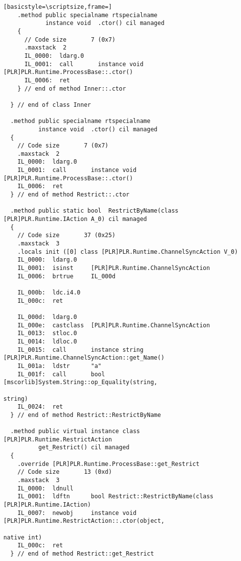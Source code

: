 \begin{lstlisting}[basicstyle=\scriptsize,frame=]
    .method public specialname rtspecialname 
            instance void  .ctor() cil managed
    {
      // Code size       7 (0x7)
      .maxstack  2
      IL_0000:  ldarg.0
      IL_0001:  call       instance void [PLR]PLR.Runtime.ProcessBase::.ctor()
      IL_0006:  ret
    } // end of method Inner::.ctor

  } // end of class Inner

  .method public specialname rtspecialname 
          instance void  .ctor() cil managed
  {
    // Code size       7 (0x7)
    .maxstack  2
    IL_0000:  ldarg.0
    IL_0001:  call       instance void [PLR]PLR.Runtime.ProcessBase::.ctor()
    IL_0006:  ret
  } // end of method Restrict::.ctor

  .method public static bool  RestrictByName(class [PLR]PLR.Runtime.IAction A_0) cil managed
  {
    // Code size       37 (0x25)
    .maxstack  3
    .locals init ([0] class [PLR]PLR.Runtime.ChannelSyncAction V_0)
    IL_0000:  ldarg.0
    IL_0001:  isinst     [PLR]PLR.Runtime.ChannelSyncAction
    IL_0006:  brtrue     IL_000d

    IL_000b:  ldc.i4.0
    IL_000c:  ret

    IL_000d:  ldarg.0
    IL_000e:  castclass  [PLR]PLR.Runtime.ChannelSyncAction
    IL_0013:  stloc.0
    IL_0014:  ldloc.0
    IL_0015:  call       instance string [PLR]PLR.Runtime.ChannelSyncAction::get_Name()
    IL_001a:  ldstr      "a"
    IL_001f:  call       bool [mscorlib]System.String::op_Equality(string,
                                                                   string)
    IL_0024:  ret
  } // end of method Restrict::RestrictByName

  .method public virtual instance class [PLR]PLR.Runtime.RestrictAction 
          get_Restrict() cil managed
  {
    .override [PLR]PLR.Runtime.ProcessBase::get_Restrict
    // Code size       13 (0xd)
    .maxstack  3
    IL_0000:  ldnull
    IL_0001:  ldftn      bool Restrict::RestrictByName(class [PLR]PLR.Runtime.IAction)
    IL_0007:  newobj     instance void [PLR]PLR.Runtime.RestrictAction::.ctor(object,
                                                                              native int)
    IL_000c:  ret
  } // end of method Restrict::get_Restrict


\end{lstlisting}
